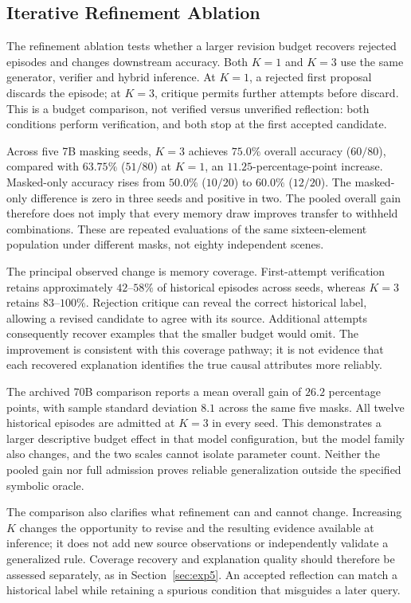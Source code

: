 \documentclass[onecolumn]{IEEEtran}
\numberwithin{equation}{section}
\theoremstyle{definition}
\theoremstyle{remark}
\begin{document}
\subsection{Iterative Refinement Ablation}
\label{sec:exp3}

The refinement ablation tests whether a larger revision budget recovers rejected episodes and changes downstream accuracy. Both $K=1$ and $K=3$ use the same generator, verifier and hybrid inference. At $K=1$, a rejected first proposal discards the episode; at $K=3$, critique permits further attempts before discard. This is a budget comparison, not verified versus unverified reflection: both conditions perform verification, and both stop at the first accepted candidate.

Across five 7B masking seeds, $K=3$ achieves $75.0\%$ overall accuracy ($60/80$), compared with $63.75\%$ ($51/80$) at $K=1$, an $11.25$-percentage-point increase. Masked-only accuracy rises from $50.0\%$ ($10/20$) to $60.0\%$ ($12/20$). The masked-only difference is zero in three seeds and positive in two. The pooled overall gain therefore does not imply that every memory draw improves transfer to withheld combinations. These are repeated evaluations of the same sixteen-element population under different masks, not eighty independent scenes.

The principal observed change is memory coverage. First-attempt verification retains approximately $42$--$58\%$ of historical episodes across seeds, whereas $K=3$ retains $83$--$100\%$. Rejection critique can reveal the correct historical label, allowing a revised candidate to agree with its source. Additional attempts consequently recover examples that the smaller budget would omit. The improvement is consistent with this coverage pathway; it is not evidence that each recovered explanation identifies the true causal attributes more reliably.

The archived 70B comparison reports a mean overall gain of $26.2$ percentage points, with sample standard deviation $8.1$ across the same five masks. All twelve historical episodes are admitted at $K=3$ in every seed. This demonstrates a larger descriptive budget effect in that model configuration, but the model family also changes, and the two scales cannot isolate parameter count. Neither the pooled gain nor full admission proves reliable generalization outside the specified symbolic oracle.

The comparison also clarifies what refinement can and cannot change. Increasing $K$ changes the opportunity to revise and the resulting evidence available at inference; it does not add new source observations or independently validate a generalized rule. Coverage recovery and explanation quality should therefore be assessed separately, as in Section~\ref{sec:exp5}. An accepted reflection can match a historical label while retaining a spurious condition that misguides a later query.
\end{document}
